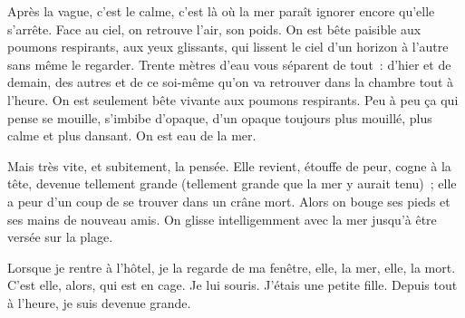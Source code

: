 {Après la vague, c'est le calme, c'est là où la mer paraît ignorer
encore qu'elle s'arrête. Face au ciel, on retrouve l'air, son poids.
On est bête paisible aux poumons respirants, aux yeux glissants, qui
lissent le ciel d'un horizon à l'autre sans même le regarder. Trente
mètres d'eau vous séparent de tout~: d'hier et de demain, des autres
et de ce soi-même qu'on va retrouver dans la chambre tout à l'heure.
On est seulement bête vivante aux poumons respirants. Peu à peu ça
qui pense se mouille, s'imbibe d'opaque, d'un opaque toujours plus
mouillé, plus calme et plus dansant. On est eau de la mer.

Mais très vite, et subitement, la pensée. Elle revient, étouffe de
peur, cogne à la tête, devenue tellement grande (tellement grande que
la mer y aurait tenu)~; elle a peur d'un coup de se trouver dans un
crâne mort. Alors on bouge ses pieds et ses mains de nouveau amis. On
glisse intelligemment avec la mer jusqu'à être versée sur la plage.

Lorsque je rentre à l'hôtel, je la regarde de ma fenêtre, elle, la
mer, elle, la mort. C'est elle, alors, qui est en cage. Je lui
souris. J'étais une petite fille. Depuis tout à l'heure, je suis
devenue grande.
}



